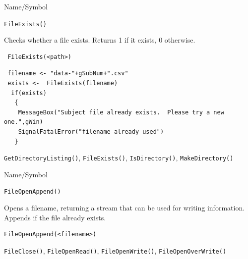 \begin{desc}{Name/Symbol}
\item[Name/Symbol]	\verb+FileExists()+

\item[Description]	Checks whether a file exists.  Returns 1 if it exists, 0 otherwise.
\item[Usage]		
\begin{verbatim}
 FileExists(<path>)
\end{verbatim}

\item[Example]	
\begin{verbatim}
 filename <- "data-"+gSubNum+".csv"
 exists <-  FileExists(filename)
  if(exists)
   {
    MessageBox("Subject file already exists.  Please try a new one.",gWin) 
    SignalFatalError("filename already used")
   }
\end{verbatim}

\item[See Also]\verb+GetDirectoryListing()+, \verb+FileExists()+,       \verb+IsDirectory()+,        
   \verb+MakeDirectory()+      

\end{desc}




\begin{desc}{Name/Symbol}
\item[Name/Symbol]	\verb+FileOpenAppend()+

\item[Description] Opens a filename, returning a stream that can be
  used for writing information.  Appends if the file already exists.

\item[Usage]
\begin{verbatim}
FileOpenAppend(<filename>)
\end{verbatim}

\item[Example]	

\item[See Also]	\verb+FileClose()+, \verb+FileOpenRead()+, \verb+FileOpenWrite()+, 
\verb+FileOpenOverWrite()+
\end{desc}




